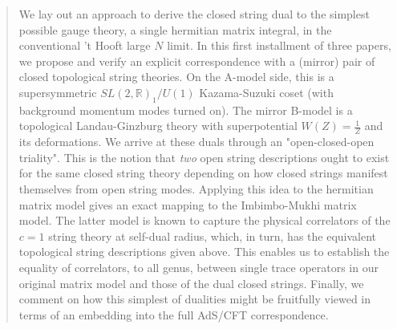 \documentclass[english]{article}
\begin{document}
\begin{abstract}
We lay out an approach to derive the closed string dual to the simplest possible gauge theory, a single hermitian matrix integral, in the conventional 't Hooft large $N$ limit. In this first installment of three papers, we propose and verify an explicit correspondence with a (mirror) pair of closed topological string theories. On the A-model side, this is a supersymmetric $SL(2, \mathbb{R})_1/U(1)$
Kazama-Suzuki coset (with background momentum modes turned on). The mirror B-model is a topological Landau-Ginzburg theory with superpotential $W(Z)=\frac{1}{Z}$ and its deformations. We arrive at these duals through an "open-closed-open triality". This is the notion that \textit{two} open string descriptions ought to exist for the same closed string theory depending on how closed strings manifest themselves from open string modes. 
Applying this idea to the hermitian matrix model gives an exact mapping to the Imbimbo-Mukhi matrix model. The latter model is known to capture the physical correlators of the $c=1$ string theory at self-dual radius, which, in turn, has the equivalent topological string descriptions given above. This enables us to establish the equality of correlators, to all genus, between single trace operators in our original matrix model and those of the dual closed strings. Finally, we comment on how this simplest of dualities might be fruitfully viewed in terms of an embedding into the full AdS/CFT correspondence. 














\end{abstract}
\end{document}

